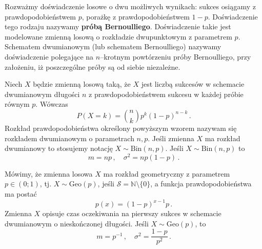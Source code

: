 \documentclass{myclass}
\numberwithin{equation}{subsection}
\begin{document}
\begin{definition}
Rozważmy doświadczenie losowe o dwu możliwych wynikach: sukces osiągamy z prawdopodobieństwem \(p\),
porażkę z prawdopodobieństwem \(1-p\). Doświadczenie tego rodzaju nazywamy \textbf{próbą
Bernoulliego}. Doświadczenie takie jest modelowane zmienną losową o rozkładzie dwupunktowym z
parametrem \(p\). Schematem dwumianowym (lub schematem Bernoulliego) nazywamy doświadczenie
polegające na \(n\)--krotnym powtórzeniu próby Bernoulliego, przy założeniu, iż poszczególne próby
są od siebie niezależne.
\end{definition}

\begin{definition}
Niech \(X\) będzie zmienną losową taką, że \(X\) jest liczbą sukcesów w schemacie dwumianowym
długości \(n\) z prawdopodobieństwem sukcesu w każdej próbie równym \(p\). Wówczas
\begin{equation*}
    P(X = k) = {n \choose k} p^k (1 - p)^{n-k}\,.
\end{equation*}
Rozkład prawdopodobieństwa określony powyższym wzorem nazywam się rozkładem dwumianowym o
parametrach \(n,p\). Jeśli zmienna \(X\) ma rozkład dwumianowy to stosujemy notację \(X \sim
\mathrm{Bin}(n,p)\). Jeśli \(X \sim \mathrm{Bin}(n,p)\) to
\begin{equation*}
    m = np\,,\quad \sigma^2 = np(1-p)\,.
\end{equation*}
\end{definition}

\begin{definition}
Mówimy, że zmienna losowa \(X\) ma rozkład geometryczny z parametrem \(p \in (0;1)\), tj. \(X \sim
\mathrm{Geo}(p)\), jeśli \(\mathcal{S} = \mathbb{N} \setminus \{0\}\), a funkcja prawdopodobieństwa
ma postać
\begin{equation*}
    p(x) = (1-p)^{x-1}p\,.
\end{equation*}
Zmienna \(X\) opisuje czas oczekiwania na pierwszy sukces w schemacie dwumianowym o nieskończonej
długości. Jeśli \(X \sim \mathrm{Geo}(p)\), to
\begin{equation*}
    m = p^{-1}\,,\quad \sigma^2 = \frac{1 - p}{p^2}\,.
\end{equation*}
\end{definition}
\end{document}
